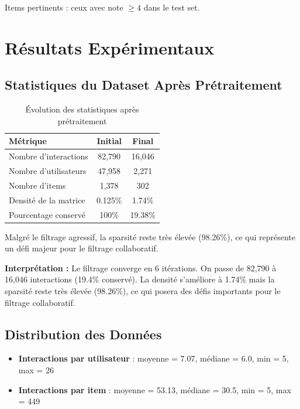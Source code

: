 \documentclass[12pt,a4paper]{article}
\begin{document}
Items pertinents : ceux avec note $\geq 4$ dans le test set.

\section{Résultats Expérimentaux}

\subsection{Statistiques du Dataset Après Prétraitement}

\begin{table}[H]
\centering
\begin{tabular}{lcc}
\toprule
\textbf{Métrique} & \textbf{Initial} & \textbf{Final} \\
\midrule
Nombre d'interactions & 82,790 & 16,046 \\
Nombre d'utilisateurs & 47,958 & 2,271 \\
Nombre d'items & 1,378 & 302 \\
Densité de la matrice & 0.125\% & 1.74\% \\
Pourcentage conservé & 100\% & 19.38\% \\
\bottomrule
\end{tabular}
\caption{Évolution des statistiques après prétraitement}
\end{table}

Malgré le filtrage agressif, la sparsité reste très élevée (98.26\%), ce qui représente un défi majeur pour le filtrage collaboratif.

\textbf{Interprétation :} Le filtrage converge en 6 itérations. On passe de 82,790 à 16,046 interactions (19.4\% conservé). La densité s'améliore à 1.74\% mais la sparsité reste très élevée (98.26\%), ce qui posera des défis importants pour le filtrage collaboratif.

\subsection{Distribution des Données}

\begin{itemize}
    \item \textbf{Interactions par utilisateur} : moyenne = 7.07, médiane = 6.0, min = 5, max = 26
    \item \textbf{Interactions par item} : moyenne = 53.13, médiane = 30.5, min = 5, max = 449
\end{itemize}
\end{document}
